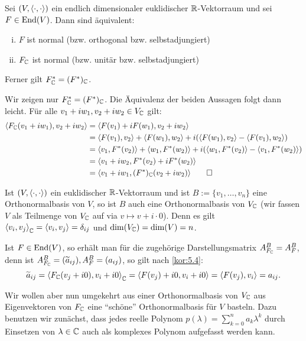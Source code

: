 \begin{lemma}
	\label{lemma:7.7}
	Sei $(V,\left\langle\cdot,\cdot\right\rangle)$ ein endlich dimensionaler euklidischer $\mathbb{R}$-Vektorraum und sei $F \in \operatorname{End}(V)$.
	Dann sind äquivalent:
	\begin{enumerate}[(i)]
		\item $F$ ist normal (bzw. orthogonal bzw. selbstadjungiert)
		\item $F_{\mathbb{C}}$ ist normal (bzw. unitär bzw. selbstadjungiert)
	\end{enumerate}
	Ferner gilt $F_{\mathbb{C}}^* = (F^*)_{\mathbb{C}}$.
\end{lemma}

\begin{beweis}
	Wir zeigen nur $F_{\mathbb{C}}^* = (F^*)_{\mathbb{C}}$.
	Die Äquivalenz der beiden Aussagen folgt dann leicht.
	Für alle $v_1+iw_1, v_2+iw_2 \in V_{\mathbb{C}}$ gilt:
	\newpage
	\vspace*{-1.3cm}
	\begin{align*}
	\sk{F_{\CC}(v_1+iw_1),v_2+iw_2} &= \sk{F(v_1) + i F(w_1),v_2+iw_2} \\
	&= \sk{F(v_1),v_2} + \sk{F(w_1),w_2} + i( \sk{F(w_1),v_2} - \sk{F(v_1),w_2}) \\
	&= \sk{v_1,F^*(v_2)} + \sk{w_1,F^*(w_2)} + i(\sk{w_1,F^*(v_2)} - \sk{v_1,F^*(w_2)}) \\
	&= \sk{v_1 + iw_2,F^*(v_2) + iF^*(w_2)} \\
	&= \sk{v_1 + iw_1, (F^*)_{\CC}(v_2+iw_2)} \qedhere
	\end{align*}
\end{beweis}

\begin{bemerkung}
	\label{bem:7.8}
	Ist $(V,\left\langle\cdot,\cdot\right\rangle)$ ein euklidischer $\mathbb{R}$-Vektorraum und ist $B := \{v_1,\dots,v_n\}$ eine Orthonormalbasis von $V$, so ist $B$ auch eine Orthonormalbasis von $V_{\mathbb{C}}$ (wir fassen $V$ als Teilmenge von $V_{\mathbb{C}}$ auf via $v \mapsto v + i \cdot 0$).
	Denn es gilt $\left\langle v_i,v_j\right\rangle_{\mathbb{C}} = \left\langle v_i,v_j\right\rangle = \delta_{ij}$ und $\dim(V_{\mathbb{C}}) = \dim(V) = n$.
	
	Ist $F \in \operatorname{End}(V)$, so erhält man für die zugehörige Darstellungsmatrix $A^B_{F_{\mathbb{C}}} = A^B_F$, denn ist $A^B_{F_{\mathbb{C}}} = (\widetilde{a}_{ij}), A^B_F = (a_{ij})$, so gilt nach \autoref{kor:5.4}:
	\[
		\widetilde{a}_{ij} = \left\langle F_{\mathbb{C}}(v_j + i0),v_i + i0\right\rangle_{\mathbb{C}} = \left\langle F(v_j)+i0,v_i+i0\right\rangle = \left\langle F(v_j),v_i\right\rangle = a_{ij}.
	\]
\end{bemerkung}

Wir wollen aber nun umgekehrt aus einer Orthonormalbasis von $V_{\mathbb{C}}$ aus Eigenvektoren von $F_{\mathbb{C}}$ eine \enquote{schöne} Orthonormalbasis für $V$ basteln.
Dazu benutzen wir zunächst, dass jedes reelle Polynom $p(\lambda) = \sum_{k=0}^{n} a_k \lambda^k$ durch Einsetzen von $\lambda \in \mathbb{C}$ auch als komplexes Polynom aufgefasst werden kann.

